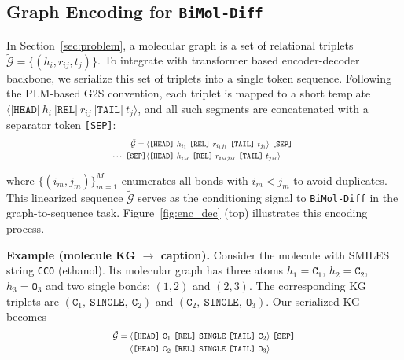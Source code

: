 









\subsection{Graph Encoding for \texttt{BiMol-Diff}}\label{sec:graph-encoding}
In Section~\ref{sec:problem}, a molecular graph is a set of
relational triplets
\(\tilde{\mathcal{G}} = \{(h_i, r_{ij}, t_j)\}\). To integrate with transformer based encoder-decoder backbone, we
serialize this set of triplets into a single token sequence. Following the
PLM-based G2S convention, each triplet is mapped to a short template
\(\langle \texttt{[HEAD]}~h_i~\texttt{[REL]}~r_{ij}~\texttt{[TAIL]}~t_j \rangle\),
and all such segments are concatenated with a separator token \texttt{[SEP]}:
\begin{equation}
    \resizebox{0.48\textwidth}{!}{$
\begin{aligned}
\tilde{\mathcal{G}} ={}&
\langle\texttt{[HEAD]}~h_{i_1}~\texttt{[REL]}~r_{i_1 j_1}~
\texttt{[TAIL]}~t_{j_1}\rangle~\texttt{[SEP]}~\\\cdots~\texttt{[SEP]}
&\langle\texttt{[HEAD]}~h_{i_M}~\texttt{[REL]}~r_{i_M j_M}~
\texttt{[TAIL]}~t_{j_M}\rangle
\end{aligned}
$}
\end{equation}


\noindent where \(\{(i_m,j_m)\}_{m=1}^M\) enumerates all bonds with \(i_m < j_m\) to avoid
duplicates. This linearized sequence \(\tilde{\mathcal{G}}\) serves
as the conditioning signal to \texttt{BiMol-Diff} in the graph-to-sequence task. Figure~\ref{fig:enc_dec} (top) illustrates this
encoding process.

\noindent \textbf{Example (molecule KG $\rightarrow$ caption).}
Consider the molecule with SMILES string \texttt{CCO} (ethanol). Its molecular
graph has three atoms
$h_1 = \texttt{C}_1$, $h_2 = \texttt{C}_2$, $h_3 = \texttt{O}_3$
and two single bonds: $(1,2)$ and $(2,3)$. The corresponding KG triplets are
$(\texttt{C}_1,\ \texttt{SINGLE},\ \texttt{C}_2)$ and
$(\texttt{C}_2,\ \texttt{SINGLE},\ \texttt{O}_3)$.
Our serialized KG becomes
\[
\resizebox{0.48\textwidth}{!}{$
\begin{aligned}
\tilde{\mathcal{G}} =\;&
\langle \texttt{[HEAD]}~\texttt{C}_1~\texttt{[REL]}~\texttt{SINGLE}~
\texttt{[TAIL]}~\texttt{C}_2 \rangle~\texttt{[SEP]} \\
&\langle \texttt{[HEAD]}~\texttt{C}_2~\texttt{[REL]}~\texttt{SINGLE}~
\texttt{[TAIL]}~\texttt{O}_3 \rangle
\end{aligned}
$}
\]

